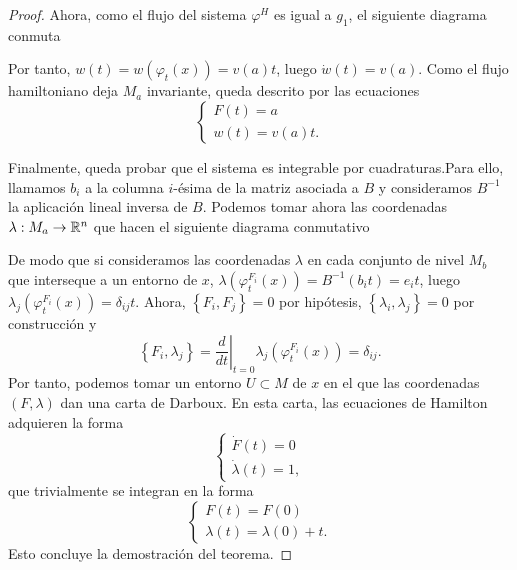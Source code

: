 \begin{proof}
Ahora, como el flujo del sistema $\varphi^H$ es igual a $g_1$, el siguiente diagrama conmuta
\begin{center}
 \end{center}
 Por tanto, $w(t)=w(\varphi_t(x))=v(a) t$, luego $\dot w(t)=v(a)$. Como el flujo hamiltoniano deja $M_a$ invariante, queda descrito por las ecuaciones
 \begin{equation*}
   \begin{cases}
     F(t)=a \\
     w(t)=v(a)t.
   \end{cases}
 \end{equation*}

 Finalmente, queda probar que el sistema es integrable por cuadraturas.Para ello, llamamos $b_i$ a la columna $i$-ésima de la matriz asociada a $B$ y consideramos $B^{-1}$ la aplicación lineal inversa de $B$. Podemos tomar ahora las coordenadas $\lambda:M_a\rightarrow \mathbb{R}^n$ que hacen el siguiente diagrama conmutativo
 \begin{center}
 \end{center}

De modo que si consideramos las coordenadas $\lambda$ en cada conjunto de nivel $M_b$ que interseque a un entorno de $x$,
  $\lambda(\varphi^{F_i}_{t}(x))=B^{-1}(b_it)=e_it$,
luego $\lambda_j(\varphi^{F_i}_{t}(x))=\delta_{ij}t$. Ahora, $\left\{ F_i,F_j \right\}=0$ por hipótesis, $\left\{ \lambda_i,\lambda_j \right\}=0$ por construcción y 
\begin{equation*}
  \left\{ F_i,\lambda_j \right\}=\left.\frac{d}{dt}\right|_{t=0}\lambda_j(\varphi^{F_i}_t(x))=\delta_{ij}.
\end{equation*}
Por tanto, podemos tomar un entorno $U\subset M$ de $x$ en el que las coordenadas $(F,\lambda)$ dan una carta de Darboux. En esta carta, las ecuaciones de Hamilton adquieren la forma
\begin{equation*}
  \begin{cases}
    \dot{F}(t)=0 \\
    \dot{\lambda}(t)=1,
  \end{cases}
\end{equation*}
que trivialmente se integran en la forma
\begin{equation*}
  \begin{cases}
    F(t)=F(0) \\
    \lambda(t)=\lambda(0)+t.
  \end{cases}
\end{equation*}
Esto concluye la demostración del teorema.
 \end{proof}

